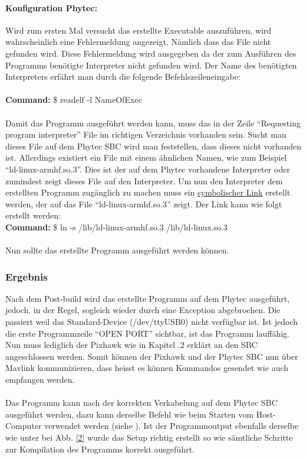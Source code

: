 \documentclass[12pt]{article} %
\begin{document}
	\newpage
	\paragraph{Konfiguration Phytec:}
	Wird zum ersten Mal versucht das erstellte Executable auszuführen, wird wahrscheinlich eine Fehlermeldung angezeigt. Nämlich dass das File nicht gefunden wird. Diese Fehlermeldung wird ausgegeben da der zum Ausführen des Programms benötigte Interpreter nicht gefunden wird. Der Name des benötigten Interpreters erfährt man durch die folgende Befehlszeileneingabe:\\
	\\ 	
	\noindent\hspace*{30mm} \textbf{Command:} \$ readelf -l NameOfExec\\
	\\
	Damit das Programm ausgeführt werden kann, muss das in der Zeile "`Requesting program interpreter"' File im richtigen Verzeichnis vorhanden sein. Sucht man dieses File auf dem Phytec SBC wird man feststellen, dass dieses nicht vorhanden ist. Allerdings existiert ein File mit einem ähnlichen Namen, wie zum Beispiel "`ld-linux-armhf.so.3"'. Dies ist der auf dem Phytec vorhandene Interpreter oder zumindest zeigt dieses File auf den Interpreter. Um nun den Interpreter dem erstellten Programm zugänglich zu machen muss ein \href{https://de.wikipedia.org/wiki/Symbolische\_Verkn\%C3\%BCpfung}{symbolischer Link} erstellt werden, der auf das File "`ld-linux-armhf.so.3"' zeigt. Der Link kann wie folgt erstellt werden:
	\\ 	
	\noindent\hspace*{30mm} \textbf{Command:} \$ ln -s /lib/ld-linux-armhf.so.3 /lib/ld-linux.so.3\\
	\\
	Nun sollte das erstellte Programm ausgeführt werden können.

	
	\subsubsection{Ergebnis}
	Nach dem Post-build wird das erstellte Programm auf dem Phytec ausgeführt, jedoch, in der Regel, sogleich wieder durch eine Exception abgebrochen. Die passiert weil das Standard-Device (/dev/ttyUSB0) nicht verfügbar ist. Ist jedoch die erste Programmzeile "`OPEN PORT"' sichtbar, ist das Programm lauffähig. Nun muss lediglich der Pixhawk wie in Kapitel \pageref{Setup}.2 erklärt an den SBC angeschlossen werden. Somit können der Pixhawk und der Phytec SBC nun über Mavlink kommunizieren, dass heisst es können Kommandos gesendet wie auch empfangen werden.\\
	\\
	Das Programm kann nach der korrekten Verkabelung auf dem Phytec SBC ausgeführt werden, dazu kann derselbe Befehl wie beim Starten vom Host-Computer verwendet werden (siehe \pageref{Exec Mav}). Ist der Programmoutput ebenfalls derselbe wie unter bei Abb. \ref{2} wurde das Setup richtig erstellt so wie sämtliche Schritte zur Kompilation des Programms korrekt ausgeführt. 
	
\end{document}
